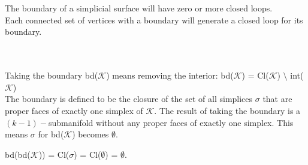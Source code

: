 \documentclass{article}
\begin{document}
\vspace{1.8cm}
\\\\

The boundary of a simplicial surface will have zero or more closed loops.\\
Each connected set of vertices with a boundary will generate a closed loop for its boundary.


\vspace{1.8cm}
\\\\

Taking the boundary bd($\mathcal{K}$) means removing the interior: bd($\mathcal{K}$) = Cl($\mathcal{K}$) $\setminus$ int($\mathcal{K}$)\\
The boundary is defined to be the closure of the set of all simplices $\sigma$ that are proper faces of exactly one simplex of $\mathcal{K}$. 
The result of taking the boundary is a $(k-1)-$submanifold without any proper faces of exactly one simplex.
This means $\sigma$ for bd($\mathcal{K}$) becomes $\emptyset$.\\
\begin{center}
    bd(bd($\mathcal{K}$)) = Cl($\sigma$) = Cl($\emptyset$) = $\emptyset$.
\end{center}
\end{document}
